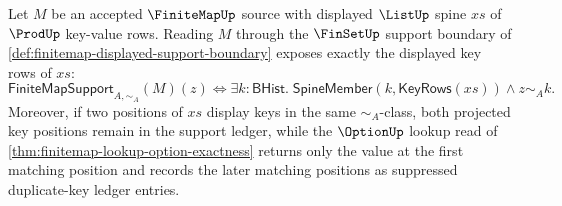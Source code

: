 \begin{theorem}
\label{thm:finitemap-displayed-support-readback}
Let $M$ be an accepted $\FiniteMapUp$ source with displayed $\ListUp$ spine $xs$ of $\ProdUp$ key-value rows. Reading $M$ through the $\FinSetUp$ support boundary of \autoref{def:finitemap-displayed-support-boundary} exposes exactly the displayed key rows of $xs$:
$$
\mathsf{FiniteMapSupport}_{A,\sim_A}(M)(z)
\Longleftrightarrow
\exists k:\mathsf{BHist}.\;\mathsf{SpineMember}(k,\mathsf{KeyRows}(xs))\land z\sim_A k.
$$
Moreover, if two positions of $xs$ display keys in the same $\sim_A$-class, both projected key positions remain in the support ledger, while the $\OptionUp$ lookup read of \autoref{thm:finitemap-lookup-option-exactness} returns only the value at the first matching position and records the later matching positions as suppressed duplicate-key ledger entries.
\end{theorem}
